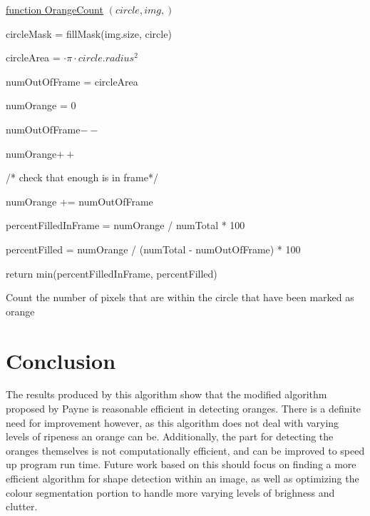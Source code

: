 \documentclass[conference]{IEEEtran}
\begin{document}
\begin{algorithm} 

    \underline{function OrangeCount} $(circle, img,)$\;
    
        
    circleMask = fillMask(img.size, circle)
    
    circleArea = $  \cdot \pi \cdot circle.radius^2$
    
    numOutOfFrame = circleArea
   
    numOrange = 0
    
    
    {
	 {
	 	numOutOfFrame$--$
		
		{
			numOrange$++$
		}
	 }
    }
    
    /* check that enough is in frame*/
    
     {
	numOrange += numOutOfFrame
    }
    
    percentFilledInFrame = numOrange / numTotal * 100
    
    percentFilled = numOrange / (numTotal - numOutOfFrame) * 100
    
    return min(percentFilledInFrame, percentFilled)
    
    
    \caption{Count the number of pixels that are within the circle that have been marked as orange} \label{OrangeCountAlg}
\end{algorithm}


\section{Conclusion}

The results produced by this algorithm show that the modified algorithm proposed by Payne is reasonable efficient in detecting oranges. There is a definite need for improvement however, as this algorithm does not deal with varying levels of ripeness an orange can be. Additionally, the part for detecting the oranges themselves is not computationally efficient, and can be improved to speed up program run time. Future work based on this should focus on finding a more efficient algorithm for shape detection within an image, as well as optimizing the colour segmentation portion to handle more varying levels of brighness and clutter.









\vspace{12pt}
\end{document}
